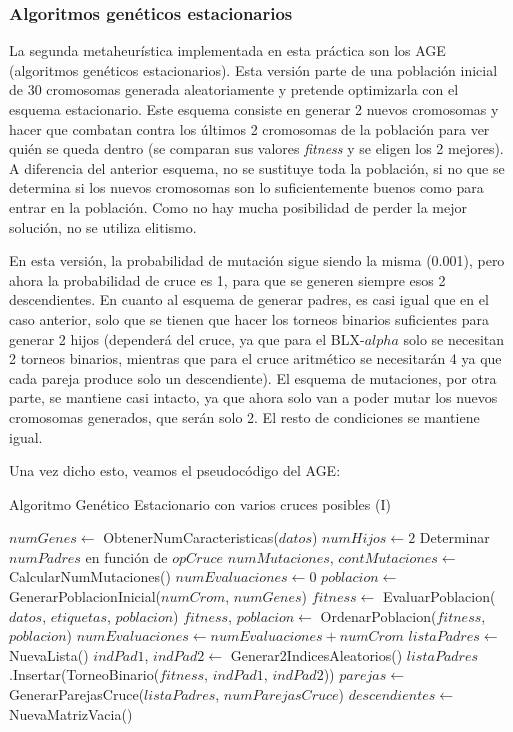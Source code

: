 \documentclass[11pt,a4paper]{article}
\begin{document}
\newpage

\subsubsection{Algoritmos genéticos estacionarios}

La segunda metaheurística implementada en esta práctica son los AGE (algoritmos genéticos estacionarios). Esta versión parte de
una población inicial de 30 cromosomas generada aleatoriamente y pretende optimizarla con el esquema estacionario. Este esquema
consiste en generar 2 nuevos cromosomas y hacer que combatan contra los últimos 2 cromosomas de la población para ver quién se
queda dentro (se comparan sus valores \textit{fitness} y se eligen los 2 mejores). A diferencia del anterior esquema, no se
sustituye toda la población, si no que se determina si los nuevos cromosomas son lo suficientemente buenos como para
entrar en la población. Como no hay mucha posibilidad de perder la mejor solución, no se utiliza elitismo.

En esta versión, la probabilidad de mutación sigue siendo la misma (0.001), pero ahora la probabilidad de cruce es 1, para
que se generen siempre esos 2 descendientes. En cuanto al esquema de generar padres, es casi igual que en el caso anterior,
solo que se tienen que hacer los torneos binarios suficientes para generar 2 hijos (dependerá del cruce, ya que para el
BLX-$alpha$ solo se necesitan 2 torneos binarios, mientras que para el cruce aritmético se necesitarán 4 ya que cada pareja
produce solo un descendiente). El esquema de mutaciones, por otra parte, se mantiene casi intacto, ya que ahora solo van a
poder mutar los nuevos cromosomas generados, que serán solo 2. El resto de condiciones se mantiene igual.

Una vez dicho esto, veamos el pseudocódigo del AGE:

\begin{algorithm}[H]
\caption{Algoritmo Genético Estacionario con varios cruces posibles (I)}
\begin{algorithmic}[1]
\State $numGenes \gets$ ObtenerNumCaracteristicas($datos$)
\State $numHijos \gets 2$ 
\State Determinar $numPadres$ en función de $opCruce$
\State $numMutaciones$, $contMutaciones \gets $ CalcularNumMutaciones()
\State $numEvaluaciones \gets 0$
\State $poblacion \gets$ GenerarPoblacionInicial($numCrom$, $numGenes$)
\State $fitness \gets$ EvaluarPoblacion($datos$, $etiquetas$, $poblacion$)
\State $fitness$, $poblacion \gets$ OrdenarPoblacion($fitness$, $poblacion$)
\State $numEvaluaciones \gets numEvaluaciones + numCrom$
	\State $listaPadres \gets $ NuevaLista()
		\State $indPad1$, $indPad2 \gets$ Generar2IndicesAleatorios()
		\State $listaPadres$.Insertar(TorneoBinario($fitness$, $indPad1$, $indPad2$))
	\EndFor
	\State $parejas \gets$ GenerarParejasCruce($listaPadres$, $numParejasCruce$)
	\State $descendientes \gets$ NuevaMatrizVacia()
\end{algorithmic}
\end{algorithm}
\end{document}
